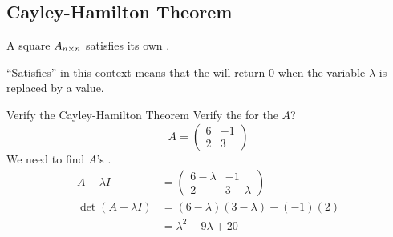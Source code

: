\subsection{Cayley-Hamilton Theorem}\label{subsec:Cayley-Hamilton_Theorem}
\begin{theorem}\label{thm:Cayley-Hamilton_Theorem}
  A square  $A_{n \times n}$ satisfies its own .
  \begin{remark*}
    ``Satisfies'' in this context means that the  will return $0$ when the variable $\lambda$ is replaced by a value.
  \end{remark*}
\end{theorem}

\begin{example}{Verify the Cayley-Hamilton Theorem}
  Verify the  for the  $A$?
  \begin{equation*}
    A =
    \begin{pmatrix}
      6 & -1 \\
      2 & 3
    \end{pmatrix}
  \end{equation*}
  \tcblower{}
  We need to find $A$'s .
  \begin{align*}
    A - \lambda I &=
                    \begin{pmatrix}
                      6 - \lambda & -1 \\
                      2 & 3 - \lambda
                    \end{pmatrix} \\
    \det(A - \lambda I) &= (6-\lambda) (3-\lambda) - (-1)(2) \\
                  &= \lambda^{2} - 9\lambda + 20
  \end{align*}


\end{example}
